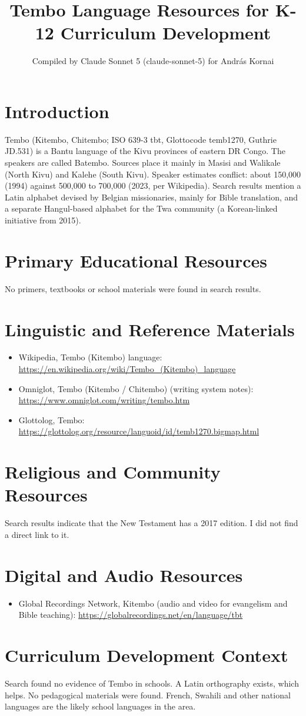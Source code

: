 \documentclass[12pt]{article}
\title{Tembo Language Resources for K-12 Curriculum Development}
\author{Compiled by Claude Sonnet 5 (claude-sonnet-5) for Andr\'as Kornai}
\date{}
\begin{document}
\maketitle

\section{Introduction}
Tembo (Kitembo, Chitembo; ISO 639-3 tbt, Glottocode temb1270, Guthrie JD.531) is a Bantu language of the Kivu provinces of eastern DR Congo. The speakers are called Batembo. Sources place it mainly in Masisi and Walikale (North Kivu) and Kalehe (South Kivu). Speaker estimates conflict: about 150,000 (1994) against 500,000 to 700,000 (2023, per Wikipedia). Search results mention a Latin alphabet devised by Belgian missionaries, mainly for Bible translation, and a separate Hangul-based alphabet for the Twa community (a Korean-linked initiative from 2015).

\section{Primary Educational Resources}
No primers, textbooks or school materials were found in search results.

\section{Linguistic and Reference Materials}
\begin{itemize}
\item Wikipedia, Tembo (Kitembo) language: \url{https://en.wikipedia.org/wiki/Tembo_(Kitembo)_language}
\item Omniglot, Tembo (Kitembo / Chitembo) (writing system notes): \url{https://www.omniglot.com/writing/tembo.htm}
\item Glottolog, Tembo: \url{https://glottolog.org/resource/languoid/id/temb1270.bigmap.html}
\end{itemize}

\section{Religious and Community Resources}
Search results indicate that the New Testament has a 2017 edition. I did not find a direct link to it.

\section{Digital and Audio Resources}
\begin{itemize}
\item Global Recordings Network, Kitembo (audio and video for evangelism and Bible teaching): \url{https://globalrecordings.net/en/language/tbt}
\end{itemize}

\section{Curriculum Development Context}
Search found no evidence of Tembo in schools. A Latin orthography exists, which helps. No pedagogical materials were found. French, Swahili and other national languages are the likely school languages in the area.
\end{document}
